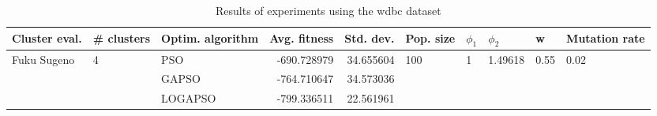 \begin{table}
\centering
\caption{Results of experiments using the wdbc dataset}
\begin{tabular}{lllrrlllll}
\toprule
               Cluster eval. &        \# clusters & Optim. algorithm &  Avg. fitness &  Std. dev. &            Pop. size &         $\phi_{1}$ &               $\phi_{2}$ &                     w &         Mutation rate \\
\midrule
\multirow{3}{*}{Fuku Sugeno} & \multirow{3}{*}{4} &              PSO &   -690.728979 &  34.655604 & \multirow{3}{*}{100} & \multirow{3}{*}{1} & \multirow{3}{*}{1.49618} & \multirow{3}{*}{0.55} & \multirow{3}{*}{0.02} \\
                             &                    &            GAPSO &   -764.710647 &  34.573036 &                      &                    &                          &                       &                       \\
                             &                    &          LOGAPSO &   -799.336511 &  22.561961 &                      &                    &                          &                       &                       \\
\bottomrule
\end{tabular}
\end{table}
